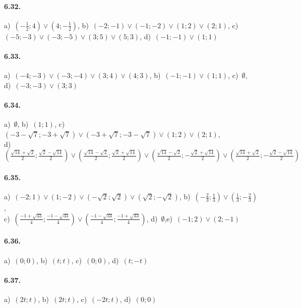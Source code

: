 \paragraph{6.32.} 
a)~\(\left(-\frac 1 2;4\right)\vee\left(4;-\frac 1 2\right)\),\quad 
b)~\((-2;-1)\vee(-1;-2)\vee(1;2)\vee(2;1)\),\quad 
c)~\((-5;-3)\vee(-3;-5)\vee(3;5)\vee(5;3)\),\quad 
d)~\((-1;-1)\vee(1;1)\)

\paragraph{6.33.} 
a)~\((-4;-3)\vee(-3;-4)\vee(3;4)\vee(4;3)\),\quad 
b)~\((-1;-1)\vee(1;1)\),\quad 
c)~\(\emptyset\),\quad 
d)~\((-3;-3)\vee(3;3)\)

\paragraph{6.34.} 
a)~\(\emptyset\),\quad 
b)~\((1;1)\),\quad 
c)~\((-3-\sqrt 7;-3+\sqrt 
7)\vee(-3+\sqrt 7;-3-\sqrt 7)\vee(1;2)\vee(2;1)\),\protect\\
\quad 
d)~\(\left(\frac{\sqrt{14}+\sqrt 2} 2;\frac{\sqrt 2-\sqrt{14}} 
2\right)\vee\left(\frac{\sqrt{14}-\sqrt 2} 2;\frac{\sqrt 2+\sqrt{14}} 
2\right)\vee\left(\frac{\sqrt{14}-\sqrt 2} 2;-\frac{\sqrt 2+\sqrt{14}} 
2\right)\vee\left(\frac{\sqrt{14}+\sqrt 2} 2;-\frac{\sqrt 2-\sqrt{14}} 
2\right)\)

\paragraph{6.35.} 
a)~\((-2;1)\vee(1;-2)\vee(-\sqrt {2};\sqrt{2})\vee(\sqrt {2};-\sqrt{2})\),
\quad 
b)~\(\left(-\frac 2 3;\frac 1 3\right)\vee\left(\frac 1 3;-\frac 2 
3\right)\),\protect\\
\quad 
c)~\(\left(\frac{-1+\sqrt{33}} 4;\frac{-1-\sqrt{33}} 4\right)\vee 
\left(\frac{-1-\sqrt{33}} 4;\frac{-1+\sqrt{33}} 4\right)\),\quad 
d)~\(\emptyset\),\quad e)~\((-1;2)\vee(2;-1)\)

\paragraph{6.36.} 
a)~\((0;0)\),\quad 
b)~\((t;t)\),\quad 
c)~\((0;0)\),\quad 
d)~\((t;-t)\)

\paragraph{6.37.} 
a)~\((2t;t)\),\quad 
b)~\((2t;t)\),\quad 
c)~\((-2t;t)\),\quad 
d)~\((0;0)\)

